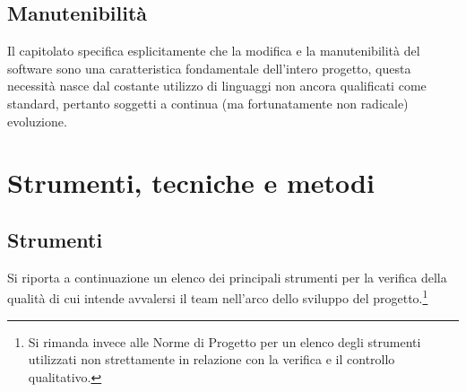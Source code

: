 \subsection{Manutenibilità}
Il capitolato specifica esplicitamente che la modifica e la manutenibilità del software sono una caratteristica fondamentale dell'intero progetto, questa necessità nasce dal costante utilizzo di linguaggi non ancora qualificati come standard, pertanto soggetti a continua (ma fortunatamente non radicale) evoluzione.

\clearpage
\section{Strumenti, tecniche e metodi}

\subsection{Strumenti}\label{sec:tools}
Si riporta a continuazione un elenco dei principali strumenti per la verifica della qualità di cui intende avvalersi il team nell'arco dello sviluppo del progetto.\footnote{Si rimanda invece alle Norme di Progetto per un elenco degli strumenti utilizzati non strettamente in relazione con la verifica e il controllo qualitativo.}
